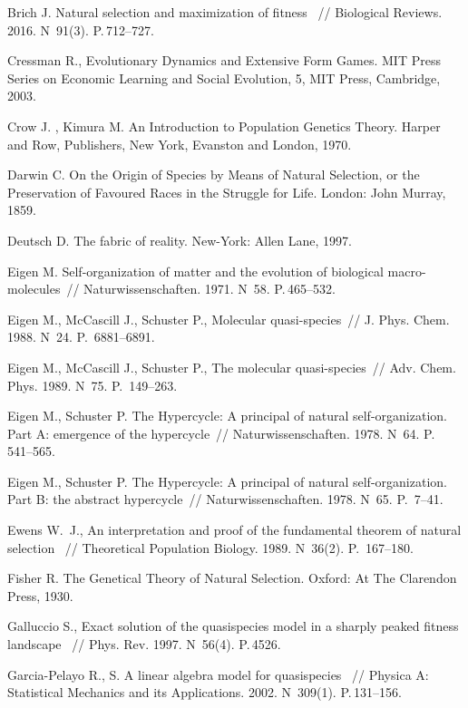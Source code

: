 \begin{thebibliography}{99}
 Brich J.\: Natural selection and maximization of fitness ~// Biological Reviews. 2016. N~91(3). P.\,712--727.

 Cressman R.\:, Evolutionary Dynamics and Extensive Form Games. MIT Press Series on Economic Learning and Social Evolution, 5, MIT Press, Cambridge, 2003.

 Crow J. , Kimura M.\: An Introduction to Population Genetics Theory. Harper and Row, Publishers, New York, Evanston and London, 1970.

 Darwin C.\: On the Origin of Species by Means of Natural Selection, or the Preservation of Favoured Races in the Struggle for Life. London: John Murray, 1859.

 Deutsch D.\: The fabric of reality. New-York: Allen Lane, 1997.

 Eigen M.\: Self-organization of matter and the evolution of biological macro-molecules~// Naturwissenschaften. 1971. N~58. P.\,465--532.

 Eigen M., McCascill J., Schuster P.\:, Molecular quasi-species~// J. Phys. Chem. 1988. N~24. P.\, 6881--6891.

 Eigen M., McCascill J., Schuster P.\:, The molecular quasi-species~// Adv. Chem. Phys. 1989. N~75. P.\, 149--263.

 Eigen M., Schuster P.\: The Hypercycle: A principal of natural self-organization. Part A: emergence of the hypercycle~// Naturwissenschaften. 1978. N~64. P.\, 541--565. 

 Eigen M., Schuster P.\: The Hypercycle: A principal of natural self-organization. Part B: the abstract hypercycle~// Naturwissenschaften. 1978. N~65. P.\, 7--41. 

 Ewens W.~J.\:, An interpretation and proof of the fundamental theorem of natural selection ~// Theoretical Population Biology. 1989. N~36(2). P.\, 167--180.

 Fisher R.\: The Genetical Theory of Natural Selection. Oxford: At The Clarendon Press, 1930.

 Galluccio S.\:, Exact solution of the quasispecies model in a sharply peaked fitness landscape ~// Phys. Rev. 1997. N~56(4). P.\,4526.

 Garcia-Pelayo R., S.\: A linear algebra model for quasispecies ~// Physica A: Statistical Mechanics and its Applications. 2002. N~309(1). P.\,131--156.


\end{thebibliography}
